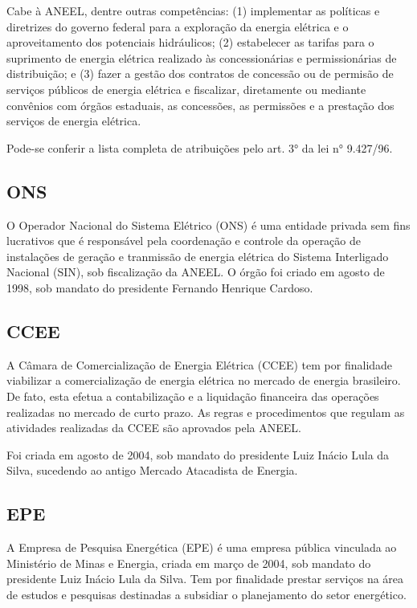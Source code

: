 \documentclass[grad,numbers]{coppe}
\begin{document}
  Cabe à ANEEL, dentre outras competências: (1) implementar as políticas e diretrizes do governo federal para a exploração da energia elétrica e o aproveitamento dos potenciais hidráulicos; (2) estabelecer as tarifas para o suprimento de energia elétrica realizado às concessionárias e permissionárias de distribuição; e (3) fazer a gestão dos contratos de concessão ou de permisão de serviços públicos de energia elétrica e fiscalizar, diretamente ou mediante convênios com órgãos estaduais, as concessões, as permissões e a prestação dos serviços de energia elétrica.

  Pode-se conferir a lista completa de atribuições pelo art. 3° da lei n°
  9.427/96.

  \hypertarget{ons}{%
  \subsection{ONS}\label{ons}}

  O Operador Nacional do Sistema Elétrico (ONS) é uma entidade privada sem fins lucrativos que é responsável pela coordenação e controle da operação de instalações de geração e tranmissão de energia elétrica do Sistema Interligado Nacional (SIN), sob fiscalização da ANEEL. O órgão foi criado em agosto de 1998, sob mandato do presidente Fernando Henrique Cardoso.

  \hypertarget{ccee}{%
  \subsection{CCEE}\label{ccee}}

  A Câmara de Comercialização de Energia Elétrica (CCEE) tem por finalidade viabilizar a comercialização de energia elétrica no mercado de energia brasileiro. De fato, esta efetua a contabilização e a liquidação financeira das operações realizadas no mercado de curto prazo. As regras e procedimentos que regulam as atividades realizadas da CCEE são aprovados pela ANEEL.

  Foi criada em agosto de 2004, sob mandato do presidente Luiz Inácio Lula da Silva, sucedendo ao antigo Mercado Atacadista de Energia.

  \hypertarget{epe}{%
  \subsection{EPE}\label{epe}}

  A Empresa de Pesquisa Energética (EPE) é uma empresa pública vinculada ao Ministério de Minas e Energia, criada em março de 2004, sob mandato do presidente Luiz Inácio Lula da Silva. Tem por finalidade prestar serviços na área de estudos e pesquisas destinadas a subsidiar o planejamento do setor energético.
\end{document}
